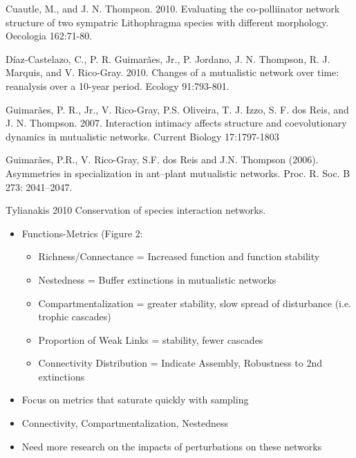\documentclass[fleqn,10pt]{wlscirep}
\begin{document}
Cuautle, M., and J. N. Thompson. 2010. Evaluating the co-polliinator
network structure of two sympatric Lithophragma species with different
morphology. Oecologia 162:71-80.

Díaz-Castelazo, C., P. R. Guimarães, Jr., P. Jordano, J. N. Thompson,
R. J. Marquis, and V. Rico-Gray. 2010. Changes of a mutualistic
network over time: reanalysis over a 10-year period. Ecology
91:793-801.


Guimarães, P. R., Jr., V. Rico-Gray, P.S. Oliveira, T. J. Izzo,
S. F. dos Reis, and J. N. Thompson. 2007. Interaction intimacy affects
structure and coevolutionary dynamics in mutualistic networks. Current
Biology 17:1797-1803

Guimarães, P.R., V. Rico-Gray, S.F. dos Reis and J.N. Thompson
(2006). Asymmetries in specialization in ant–plant mutualistic
networks. Proc. R. Soc. B 273: 2041–2047.


Tylianakis 2010 Conservation of species interaction networks.
\begin{itemize}
\item Functions-Metrics (Figure 2: 
  \begin{itemize}
  \item Richness/Connectance = Increased function and function
    stability
  \item Nestedness = Buffer extinctions in mutualistic networks
  \item Compartmentalization = greater stability, slow spread of
    disturbance (i.e. trophic cascades)
  \item Proportion of Weak Links = stability, fewer cascades
  \item Connectivity Distribution = Indicate Assembly, Robustness to
    2nd extinctions
  \end{itemize}
\item Focus on metrics that saturate quickly with sampling
\item Connectivity, Compartmentalization, Nestedness
\item Need more research on the impacts of perturbations on these
  networks
\end{itemize}
\end{document}

